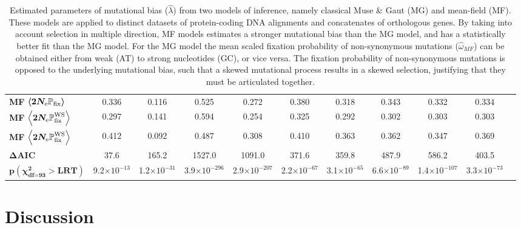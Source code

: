 \documentclass{article}
\begin{document}
\begin{table}[h]
{\begin{tabu}{l||c|c|c|c|c|c|c|c|c|c|}
   \textbf{MF }$\bm{\left\langle 2 N_{\text{e}} \mathbb{P}_{\text{fix}} \right\rangle}$ & \large{0.336} & \large{0.116} &0.525 & \large{0.272} & \large{0.380} & \large{0.318} & \large{0.343} & \large{0.332} & \large{0.334} \\
   \textbf{MF }$\bm{\left\langle 2 N_{\text{e}} \mathbb{P}_{\text{fix}}^{\text{WS}} \right\rangle}$ & \large{0.297} & \large{0.141} & \large{0.594} & \large{0.254} & \large{0.325} & \large{0.292} & \large{0.302} & \large{0.303} & \large{0.303} \\
   \textbf{MF }$\bm{\left\langle 2 N_{\text{e}} \mathbb{P}_{\text{fix}}^{\text{WS}} \right\rangle}$ & \large{0.412} & \large{0.092} & \large{0.487} & \large{0.308} & \large{0.410} & \large{0.363} & \large{0.362} & \large{0.347} & \large{0.369} \\
   \textbf{$\bm{\Delta}$AIC} & \large{37.6} & \large{165.2} & \large{1527.0} & \large{1091.0} & \large{371.6} & \large{359.8} & \large{487.9} & \large{586.2} & \large{403.5} \\
   \textbf{$\bm{p\left( \chi_{\text{df=}93}^2 > \text{LRT}\right)}$} & \large{9.2$\times 10^{-13}$} & \large{1.2$\times 10^{-31}$} & \large{3.9$\times 10^{-296}$} & \large{2.9$\times 10^{-207}$} & \large{2.2$\times 10^{-67}$} & \large{3.1$\times 10^{-65}$} & \large{6.6$\times 10^{-89}$} & \large{1.4$\times 10^{-107}$} & \large{3.3$\times 10^{-73}$} \\
   \bottomrule
  \end{tabu}}
 \caption[Estimated parameters]{
  Estimated parameters of mutational bias ($\widehat{\lambda}$) from two models of inference, namely classical Muse \& Gaut ({MG}) and mean-field ({MF}).
  These models are applied to distinct datasets of protein-coding {DNA} alignments and concatenates of orthologous genes.
  By taking into account selection in multiple direction, {MF} models estimates a stronger mutational bias than the {MG} model, and has a statistically better fit than the MG model.
  For the {MG} model the mean scaled fixation probability of {non-synonymous} mutations ($\widehat{\omega}_{MF}$) can be obtained either from weak (AT) to strong nucleotides (GC), or vice versa.
  The fixation probability of {non-synonymous} mutations is opposed to the underlying mutational bias, such that a skewed mutational process results in a skewed selection, justifying that they must be articulated together.
 }
 \label{tab:mut-bias-estimation}
\end{table}

\section{Discussion}\label{sec:discussion}
\end{document}
